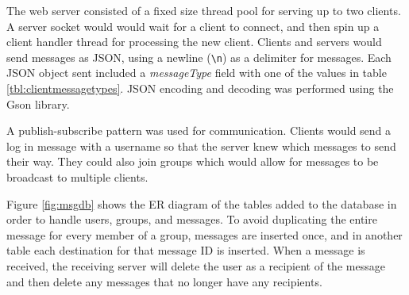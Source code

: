 \documentclass[12pt]{article}
\begin{document}
The web server consisted of a fixed size thread pool for serving up to two clients. A server socket would would wait for a client to connect, and then spin up a client handler thread for processing the new client. Clients and servers would send messages as JSON, using a newline (\lstinline{\n}) as a delimiter for messages. Each JSON object sent included a \emph{messageType} field with one of the values in table \ref{tbl:clientmessagetypes}. JSON encoding and decoding was performed using the Gson library. 

A publish-subscribe pattern was used for communication. Clients would send a log in message with a username so that the server knew which messages to send their way. They could also join groups which would allow for messages to be broadcast to multiple clients. 

\begin{table}[!h]
\centering
{}
\caption{Messages sent between client and server.}
\label{tbl:clientmessagetypes}
\end{table}

Figure \ref{fig:msgdb} shows the ER diagram of the tables added to the database in order to handle users, groups, and messages. To avoid duplicating the entire message for every member of a group, messages are inserted once, and in another table each destination for that message ID is inserted. When a message is received, the receiving server will delete the user as a recipient of the message and then delete any messages that no longer have any recipients.
\end{document}
